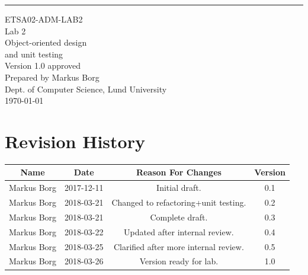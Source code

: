 \documentclass{scrreprt}
\date{}
\def\myversion{1.0 }
\begin{document}
\begin{flushright}
    \rule{16cm}{5pt}\vskip1cm
    \begin{bfseries}
    	\LARGE{ETSA02-ADM-LAB2}\\
    	\vspace{1.5cm}
        \Huge{Lab 2}\\
        \vspace{0.5cm}
        Object-oriented design\\
        \vspace{0.5cm}
        and unit testing\\
        \vspace{1.5cm}
        \LARGE{Version \myversion approved}\\
        \vspace{1.5cm}
        Prepared by Markus Borg\\
        Dept. of Computer Science, Lund University\\
        \vspace{1.5cm}
        \today\\
    \end{bfseries}
\end{flushright}


\chapter*{Revision History}

\begin{center}
    \begin{tabular}{|c|c|c|c|}
        \hline
	    Name & Date & Reason For Changes & Version\\
        \hline
	    Markus Borg & 2017-12-11 & Initial draft. & 0.1\\
        \hline
        Markus Borg & 2018-03-21 & Changed to refactoring+unit testing. & 0.2\\
        \hline
        Markus Borg & 2018-03-21 & Complete draft. & 0.3\\
        \hline
        Markus Borg & 2018-03-22 & Updated after internal review. & 0.4\\
        \hline
        Markus Borg & 2018-03-25 & Clarified after more internal review. & 0.5\\
        \hline
        Markus Borg & 2018-03-26 & Version ready for lab. & 1.0\\
        \hline
    \end{tabular}
\end{center}
\end{document}
